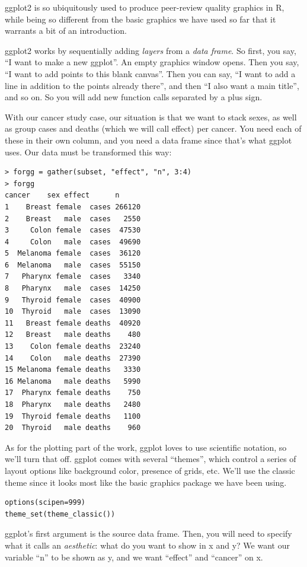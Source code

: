 \documentclass{report}
\newcommand{\code}[1]{\textsf{\ttfamily #1}}
\begin{document}
	\code{ggplot2} is so ubiquitously used to produce peer-review quality graphics in R, while being so different from the basic graphics we have used so far that it warrants a bit of an introduction.
	
	\code{ggplot2} works by sequentially adding \emph{layers} from a \emph{data frame}. So first, you say, ``I want to make a new \code{ggplot}''. An empty graphics window opens. Then you say, ``I want to add points to this blank canvas''. Then you can say, ``I want to add a line in addition to the points already there'', and then ``I also want a main title'', and so on. So you will add new function calls separated by a plus sign.
	
	With our cancer study case, our situation is that we want to stack sexes, as well as group cases and deaths (which we will call effect) per cancer. You need each of these in their own column, and you need a data frame since that's what \code{ggplot} uses. Our data must be transformed this way:
	\begin{verbatim}
> forgg = gather(subset, "effect", "n", 3:4)
> forgg
cancer    sex effect      n
1    Breast female  cases 266120
2    Breast   male  cases   2550
3     Colon female  cases  47530
4     Colon   male  cases  49690
5  Melanoma female  cases  36120
6  Melanoma   male  cases  55150
7   Pharynx female  cases   3340
8   Pharynx   male  cases  14250
9   Thyroid female  cases  40900
10  Thyroid   male  cases  13090
11   Breast female deaths  40920
12   Breast   male deaths    480
13    Colon female deaths  23240
14    Colon   male deaths  27390
15 Melanoma female deaths   3330
16 Melanoma   male deaths   5990
17  Pharynx female deaths    750
18  Pharynx   male deaths   2480
19  Thyroid female deaths   1100
20  Thyroid   male deaths    960
\end{verbatim}
	
	As for the plotting part of the work, \code{ggplot} loves to use scientific notation, so we'll turn that off. \code{ggplot} comes with several ``themes'', which control a series of layout options like background color, presence of grids, etc. We'll use the classic theme since it looks most like the basic graphics package we have been using.
	\begin{verbatim}
options(scipen=999)
theme_set(theme_classic())
	\end{verbatim}
	
	\code{ggplot}'s first argument is the source data frame. Then, you will need to specify what it calls an \emph{aesthetic}: what do you want to show in x and y? We want our variable ``n'' to be shown as y, and we want ``effect'' and ``cancer'' on x.
	
\end{document}
